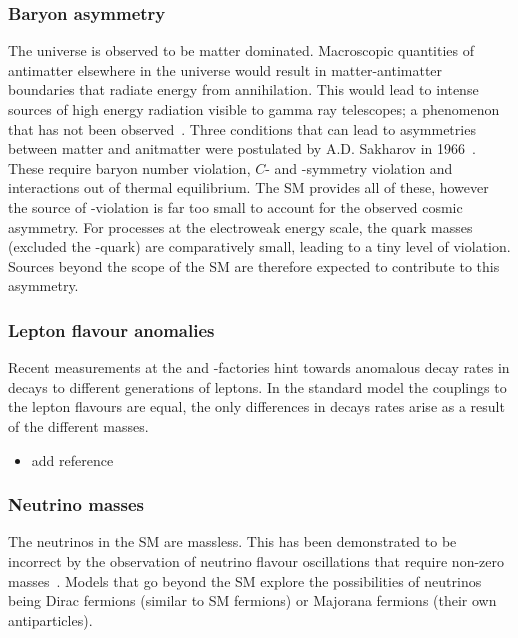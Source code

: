 \subsubsection{Baryon asymmetry} 

The universe is observed to be matter dominated. Macroscopic quantities of antimatter elsewhere in the universe would result in matter-antimatter boundaries that radiate energy from annihilation. This would lead to intense sources of high energy radiation visible to gamma ray telescopes; a phenomenon that has not been observed~\cite{vonBallmoos2014}. 
Three conditions that can lead to asymmetries between matter and anitmatter were postulated by A.D. Sakharov in 1966~\cite{Sakharov:1967dj}. These require baryon number violation, $C$- and \CP-symmetry violation and interactions out of thermal equilibrium. The SM provides all of these, however the source of \CP-violation is far too small to account for the observed cosmic asymmetry. For processes at the electroweak energy scale, the quark masses (excluded the \tquark-quark) are comparatively small, leading to a tiny level of \CP violation. Sources beyond the scope of the SM are therefore expected to contribute to this asymmetry. 

\subsubsection{Lepton flavour anomalies}
Recent measurements at the \lhc and \B-factories hint towards anomalous decay rates in decays to different generations of leptons. In the standard model the couplings to the lepton flavours are equal, the only differences in decays rates arise as a result of the different masses.

{\color{Red}
\begin{itemize}
\item add reference 
\end{itemize}
}

\subsubsection{Neutrino masses} 
The neutrinos in the SM are massless. This has been demonstrated to be incorrect by the observation of neutrino flavour oscillations that require non-zero masses~\cite{PhysRevLett.81.1158,PhysRevLett.87.071301}. Models that go beyond the SM explore the possibilities of neutrinos being Dirac fermions (similar to SM fermions) or Majorana fermions (their own antiparticles). 


